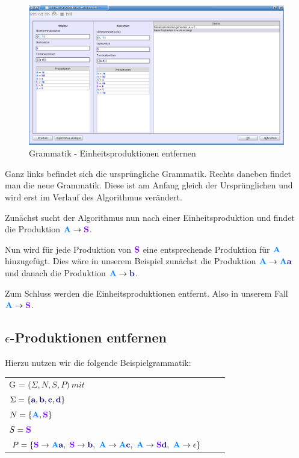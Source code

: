 \begin{figure}[h]
\begin{center}
\includegraphics[width=12cm]{../images/unit_productions.png}
\caption{Grammatik - Einheitsproduktionen entfernen}
\end{center}
\end{figure}

Ganz links befindet sich die ursprüngliche Grammatik. Rechts daneben findet man die neue Grammatik. Diese ist am Anfang gleich der Ursprünglichen und wird erst im Verlauf des Algorithmus verändert.

Zunächst sucht der Algorithmus nun nach einer Einheitsproduktion und findet die Produktion $\NonterminalSymbol{A} \to \StartSymbol{S}$.

Nun wird für jede Produktion von $\StartSymbol{S}$ eine entsprechende Produktion für $\NonterminalSymbol{A}$ hinzugefügt. Dies wäre in unserem Beispiel zunächst die Produktion $\NonterminalSymbol{A} \to \NonterminalSymbol{A}\TerminalSymbol{a}$ und danach die Produktion $\NonterminalSymbol{A} \to \TerminalSymbol{b}$.

Zum Schluss werden die Einheitsproduktionen entfernt. Also in unserem Fall $\NonterminalSymbol{A} \to \StartSymbol{S}$.

\subsection{$\epsilon$-Produktionen entfernen}

Hierzu nutzen wir die folgende Beispielgrammatik:

\begin{tabular}{lcr}
G = ($\Sigma, N, S, P )\ mit $\\
$\Sigma = \{\TerminalSymbol{a}, \TerminalSymbol{b}, \TerminalSymbol{c},
\TerminalSymbol{d}\}$\\ $N =
\{\NonterminalSymbol{A}, \StartSymbol{S}\}$\\ $S=\StartSymbol{S}$\\
$P = \{\StartSymbol{S} \to \NonterminalSymbol{A}\TerminalSymbol{a},\ \StartSymbol{S} \to \TerminalSymbol{b},\
\NonterminalSymbol{A}	\to \NonterminalSymbol{A}\TerminalSymbol{c},\ \NonterminalSymbol{A} \to \StartSymbol{S}\TerminalSymbol{d},\
\NonterminalSymbol{A} \to \epsilon\}$\\
\end{tabular}

